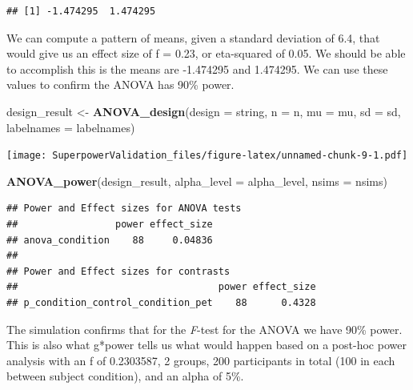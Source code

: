 \documentclass[]{book}
\newenvironment{Shaded}{\begin{snugshade}}{\end{snugshade}}
\newcommand{\DataTypeTok}[1]{\textcolor[rgb]{0.13,0.29,0.53}{#1}}
\newcommand{\KeywordTok}[1]{\textcolor[rgb]{0.13,0.29,0.53}{\textbf{#1}}}
\newcommand{\NormalTok}[1]{#1}
\newcommand{\StringTok}[1]{\textcolor[rgb]{0.31,0.60,0.02}{#1}}
\begin{document}
\begin{verbatim}
## [1] -1.474295  1.474295
\end{verbatim}

We can compute a pattern of means, given a standard deviation of 6.4, that would give us an effect size of f = 0.23, or eta-squared of 0.05. We should be able to accomplish this is the means are -1.474295 and 1.474295. We can use these values to confirm the ANOVA has 90\% power.

\begin{Shaded}
\begin{Highlighting}[]
\NormalTok{design_result <-}\StringTok{ }\KeywordTok{ANOVA_design}\NormalTok{(}\DataTypeTok{design =}\NormalTok{ string,}
                   \DataTypeTok{n =}\NormalTok{ n, }
                   \DataTypeTok{mu =}\NormalTok{ mu, }
                   \DataTypeTok{sd =}\NormalTok{ sd, }
                   \DataTypeTok{labelnames =}\NormalTok{ labelnames)}
\end{Highlighting}
\end{Shaded}

\texttt{[image: SuperpowerValidation\_files/figure-latex/unnamed-chunk-9-1.pdf]}

\begin{Shaded}
\begin{Highlighting}[]
\KeywordTok{ANOVA_power}\NormalTok{(design_result, }\DataTypeTok{alpha_level =}\NormalTok{ alpha_level, }\DataTypeTok{nsims =}\NormalTok{ nsims)}
\end{Highlighting}
\end{Shaded}

\begin{verbatim}
## Power and Effect sizes for ANOVA tests
##                 power effect_size
## anova_condition    88     0.04836
## 
## Power and Effect sizes for contrasts
##                                   power effect_size
## p_condition_control_condition_pet    88      0.4328
\end{verbatim}

The simulation confirms that for the \emph{F}-test for the ANOVA we have 90\% power. This is also what g*power tells us what would happen based on a post-hoc power analysis with an f of 0.2303587, 2 groups, 200 participants in total (100 in each between subject condition), and an alpha of 5\%.
\end{document}
